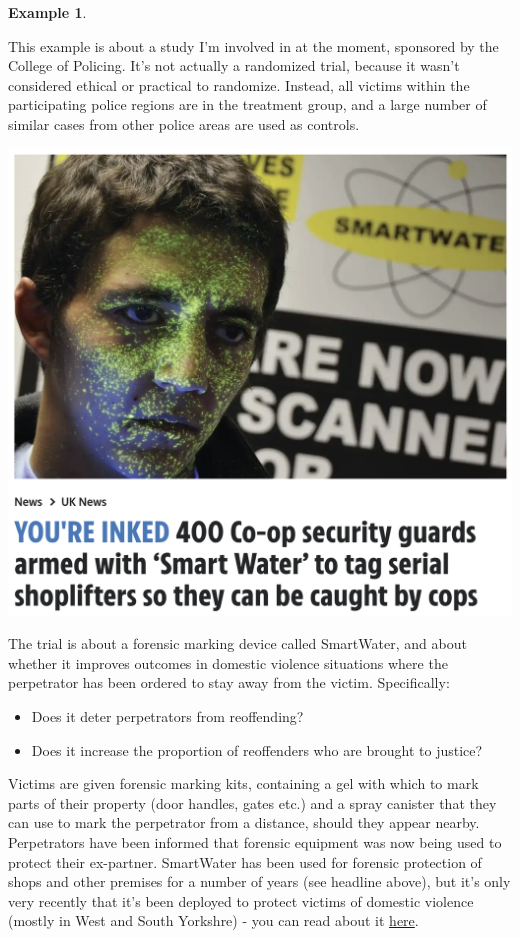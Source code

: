 \documentclass[
  openany]{book}
\providecommand{\tightlist}{%
  \setlength{\itemsep}{0pt}\setlength{\parskip}{0pt}}
\theoremstyle{definition}
\theoremstyle{definition}
\newtheorem{example}{Example}[chapter]
\theoremstyle{definition}
\theoremstyle{definition}
\theoremstyle{remark}
\begin{document}
\begin{example}
\protect\hypertarget{exm:cop}{}\label{exm:cop}

This example is about a study I'm involved in at the moment, sponsored by the College of Policing. It's not actually a randomized trial, because it wasn't considered ethical or practical to randomize. Instead, all victims within the participating police regions are in the treatment group, and a large number of similar cases from other police areas are used as controls.

\includegraphics{images/smartwater.png}

The trial is about a forensic marking device called SmartWater, and about whether it improves outcomes in domestic violence situations where the perpetrator has been ordered to stay away from the victim. Specifically:

\begin{itemize}
\tightlist
\item
  Does it deter perpetrators from reoffending?
\item
  Does it increase the proportion of reoffenders who are brought to justice?
\end{itemize}

Victims are given forensic marking kits, containing a gel with which to mark parts of their property (door handles, gates etc.) and a spray canister that they can use to mark the perpetrator from a distance, should they appear nearby. Perpetrators have been informed that forensic equipment was now being used to protect their ex-partner. SmartWater has been used for forensic protection of shops and other premises for a number of years (see headline above), but it's only very recently that it's been deployed to protect victims of domestic violence (mostly in West and South Yorkshre) - you can read about it \href{https://www.bbc.co.uk/news/technology-60414452}{here}.


\end{example}
\end{document}
